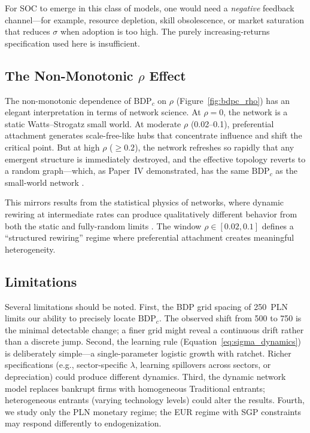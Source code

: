 \documentclass[12pt,a4paper]{article}
\begin{document}
For SOC to emerge in this class of models, one would need a
\emph{negative} feedback channel---for example, resource depletion,
skill obsolescence, or market saturation that reduces $\sigma$ when
adoption is too high. The purely increasing-returns specification
used here is insufficient.

\subsection{The Non-Monotonic $\rho$ Effect}\label{sec:nonmono}

The non-monotonic dependence of $\mathrm{BDP}_c$ on $\rho$
(Figure~\ref{fig:bdpc_rho}) has an elegant interpretation in terms
of network science. At $\rho = 0$, the network is a static
Watts--Strogatz small world. At moderate $\rho$ (0.02--0.1),
preferential attachment generates scale-free-like hubs that concentrate
influence and shift the critical point. But at high $\rho$ ($\ge 0.2$),
the network refreshes so rapidly that any emergent structure is
immediately destroyed, and the effective topology reverts to a random
graph---which, as Paper~IV demonstrated, has the same $\mathrm{BDP}_c$
as the small-world network \parencite{Maciaszek2026d}.

This mirrors results from the statistical physics of networks, where
dynamic rewiring at intermediate rates can produce qualitatively
different behavior from both the static and fully-random limits
\parencite{Albert2002, Castellano2009}. The window $\rho \in [0.02,
0.1]$ defines a ``structured rewiring'' regime where preferential
attachment creates meaningful heterogeneity.

\subsection{Limitations}\label{sec:limitations}

Several limitations should be noted. First, the BDP grid spacing of
250~PLN limits our ability to precisely locate $\mathrm{BDP}_c$.
The observed shift from 500 to 750 is the minimal detectable change;
a finer grid might reveal a continuous drift rather than a discrete
jump. Second, the learning rule (Equation~\ref{eq:sigma_dynamics})
is deliberately simple---a single-parameter logistic growth with
ratchet. Richer specifications (e.g., sector-specific $\lambda$,
learning spillovers across sectors, or depreciation) could produce
different dynamics. Third, the dynamic network model replaces
bankrupt firms with homogeneous Traditional entrants; heterogeneous
entrants (varying technology levels) could alter the results.
Fourth, we study only the PLN monetary regime; the EUR regime with
SGP constraints may respond differently to endogenization.
\end{document}
